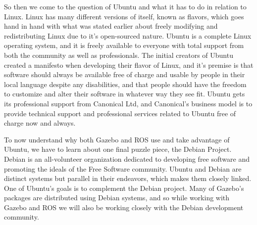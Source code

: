 \documentclass[12pt]{report}
\begin{document}
So then we come to the question of Ubuntu and what it has to do in relation to Linux. Linux has many different versions of itself, known as flavors, which goes hand in hand with what was stated earlier about freely modifying and redistributing Linux due to it's open-sourced nature. Ubuntu is a complete Linux operating system, and it is freely available to everyone with total support from both the community as well as professionals. The initial creators of Ubuntu created a manifesto when developing their flavor of Linux, and it's premise is that software should always be available free of charge and usable by people in their local language despite any disabilities, and that people should have the freedom to customize and alter their software in whatever way they see fit.\cite{Ubuntu} Ubuntu gets its professional support from Canonical Ltd, and Canonical's business model is to provide technical support and professional services related to Ubuntu free of charge now and always.

To now understand why both Gazebo and ROS use and take advantage of Ubuntu, we have to learn about one final puzzle piece, the Debian Project. Debian is an all-volunteer organization dedicated to developing free software and promoting the ideals of the Free Software community. \cite{Debian} Ubuntu and Debian are distinct systems but parallel in their endeavors, which makes them closely linked. One of Ubuntu's goals is to complement the Debian project. Many of Gazebo's packages are distributed using Debian systems, and so while working with Gazebo and ROS we will also be working closely with the Debian development community.
\end{document}
